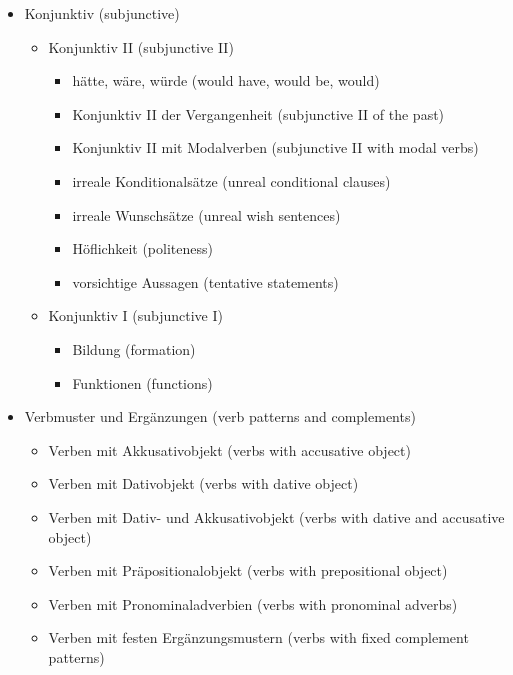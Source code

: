 \documentclass[a4paper]{article}
\begin{document}
\begin{itemize}
\begin{itemize}
                \item Konjunktiv {\small (subjunctive)}
                \begin{itemize}
                    \item Konjunktiv II {\small (subjunctive II)}
                    \begin{itemize}
                        \item hätte, wäre, würde {\small (would have, would be, would)}
                        \item Konjunktiv II der Vergangenheit {\small (subjunctive II of the past)}
                        \item Konjunktiv II mit Modalverben {\small (subjunctive II with modal verbs)}
                        \item irreale Konditionalsätze {\small (unreal conditional clauses)}
                        \item irreale Wunschsätze {\small (unreal wish sentences)}
                        \item Höflichkeit {\small (politeness)}
                        \item vorsichtige Aussagen {\small (tentative statements)}
                    \end{itemize}
                    \item Konjunktiv I {\small (subjunctive I)}
                    \begin{itemize}
                        \item Bildung {\small (formation)}
                        \item Funktionen {\small (functions)}
                    \end{itemize}
                \end{itemize}
                
                \item Verbmuster und Ergänzungen {\small (verb patterns and complements)}
                \begin{itemize}
                    \item Verben mit Akkusativobjekt {\small (verbs with accusative object)}
                    \item Verben mit Dativobjekt {\small (verbs with dative object)}
                    \item Verben mit Dativ- und Akkusativobjekt {\small (verbs with dative and accusative object)}
                    \item Verben mit Präpositionalobjekt {\small (verbs with prepositional object)}
                    \item Verben mit Pronominaladverbien {\small (verbs with pronominal adverbs)}
                    \item Verben mit festen Ergänzungsmustern {\small (verbs with fixed complement patterns)}
                \end{itemize}
                

\end{itemize}
\end{itemize}
\end{document}
